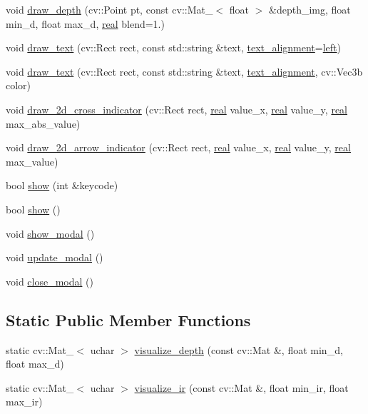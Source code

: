 \begin{DoxyCompactItemize}
\item 
void \hyperlink{classtlz_1_1viewer_a78038466514d156c955a1357774ecd7b}{draw\+\_\+depth} (cv\+::\+Point pt, const cv\+::\+Mat\+\_\+$<$ float $>$ \&depth\+\_\+img, float min\+\_\+d, float max\+\_\+d, \hyperlink{namespacetlz_a15fd37cce97f2b8b606af18c2615f602}{real} blend=1.)
\item 
void \hyperlink{classtlz_1_1viewer_ad4fda702b7c5af2cb0bb9bc3842113f3}{draw\+\_\+text} (cv\+::\+Rect rect, const std\+::string \&text, \hyperlink{classtlz_1_1viewer_a280addd8c203232bdaf5ae4dc85a139a}{text\+\_\+alignment}=\hyperlink{classtlz_1_1viewer_a280addd8c203232bdaf5ae4dc85a139aa7d9efcc435fbfbde49c6c8e256405f68}{left})
\item 
void \hyperlink{classtlz_1_1viewer_a77f6415434e333f66ede754eda425cd7}{draw\+\_\+text} (cv\+::\+Rect rect, const std\+::string \&text, \hyperlink{classtlz_1_1viewer_a280addd8c203232bdaf5ae4dc85a139a}{text\+\_\+alignment}, cv\+::\+Vec3b color)
\item 
void \hyperlink{classtlz_1_1viewer_a09c3c6e9c5a5341576cea9210a6d8246}{draw\+\_\+2d\+\_\+cross\+\_\+indicator} (cv\+::\+Rect rect, \hyperlink{namespacetlz_a15fd37cce97f2b8b606af18c2615f602}{real} value\+\_\+x, \hyperlink{namespacetlz_a15fd37cce97f2b8b606af18c2615f602}{real} value\+\_\+y, \hyperlink{namespacetlz_a15fd37cce97f2b8b606af18c2615f602}{real} max\+\_\+abs\+\_\+value)
\item 
void \hyperlink{classtlz_1_1viewer_ac882ef84c24e8c209c13e2308c5c8c0c}{draw\+\_\+2d\+\_\+arrow\+\_\+indicator} (cv\+::\+Rect rect, \hyperlink{namespacetlz_a15fd37cce97f2b8b606af18c2615f602}{real} value\+\_\+x, \hyperlink{namespacetlz_a15fd37cce97f2b8b606af18c2615f602}{real} value\+\_\+y, \hyperlink{namespacetlz_a15fd37cce97f2b8b606af18c2615f602}{real} max\+\_\+value)
\item 
bool \hyperlink{classtlz_1_1viewer_aabb3cdde75783ed1a41801fb236bc50e}{show} (int \&keycode)
\item 
bool \hyperlink{classtlz_1_1viewer_a96ab5d3d95f438355c6a221658199184}{show} ()
\item 
void \hyperlink{classtlz_1_1viewer_a4ccb30b02c81909ba1af97745375385a}{show\+\_\+modal} ()
\item 
void \hyperlink{classtlz_1_1viewer_a39742c89e09f32e2d2c9162882dc158c}{update\+\_\+modal} ()
\item 
void \hyperlink{classtlz_1_1viewer_ae84f2b4938b897ac7cef4940056a1949}{close\+\_\+modal} ()
\end{DoxyCompactItemize}
\subsection*{Static Public Member Functions}
\begin{DoxyCompactItemize}
\item 
static cv\+::\+Mat\+\_\+$<$ uchar $>$ \hyperlink{classtlz_1_1viewer_a6a59617413dc76948b6802399ddf555b}{visualize\+\_\+depth} (const cv\+::\+Mat \&, float min\+\_\+d, float max\+\_\+d)
\item 
static cv\+::\+Mat\+\_\+$<$ uchar $>$ \hyperlink{classtlz_1_1viewer_adef64a6ebf1391fd02c1231b9fde281f}{visualize\+\_\+ir} (const cv\+::\+Mat \&, float min\+\_\+ir, float max\+\_\+ir)
\end{DoxyCompactItemize}
